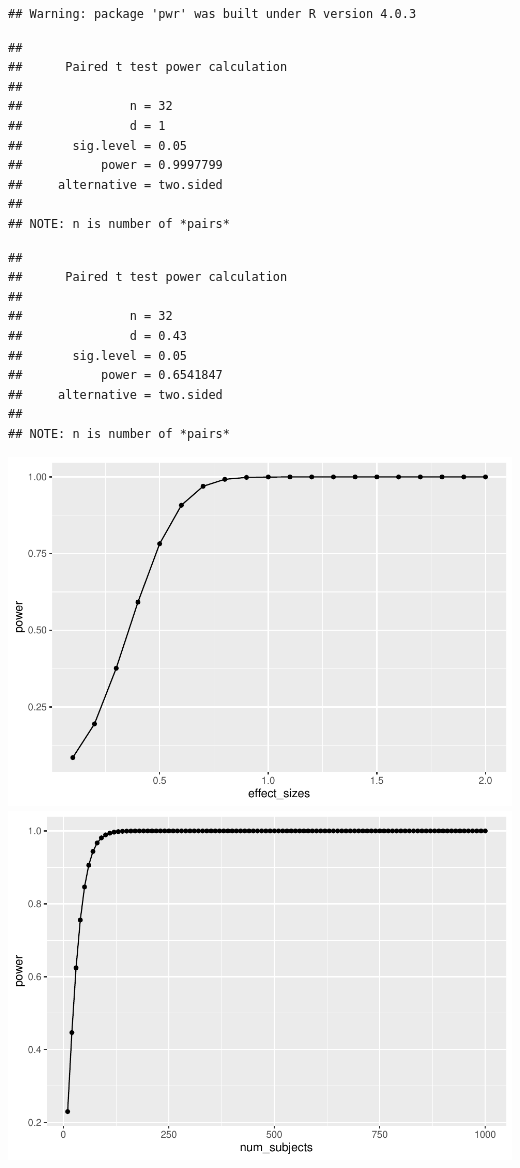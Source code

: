 \documentclass[
  english,
  man]{apa6}
\begin{document}
\begin{verbatim}
## Warning: package 'pwr' was built under R version 4.0.3
\end{verbatim}

\begin{verbatim}
## 
##      Paired t test power calculation 
## 
##               n = 32
##               d = 1
##       sig.level = 0.05
##           power = 0.9997799
##     alternative = two.sided
## 
## NOTE: n is number of *pairs*
\end{verbatim}

\begin{verbatim}
## 
##      Paired t test power calculation 
## 
##               n = 32
##               d = 0.43
##       sig.level = 0.05
##           power = 0.6541847
##     alternative = two.sided
## 
## NOTE: n is number of *pairs*
\end{verbatim}

\includegraphics{APAReport_files/figure-latex/unnamed-chunk-6-1.pdf} \includegraphics{APAReport_files/figure-latex/unnamed-chunk-6-2.pdf}
\end{document}
